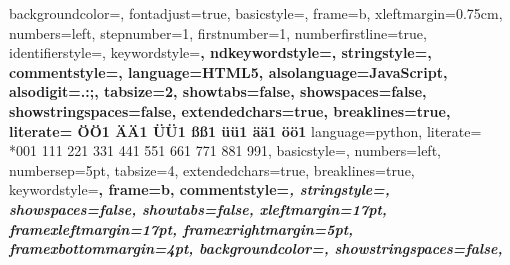  {%
	backgroundcolor=\color{editorGray},
		fontadjust=true,
	basicstyle=\small\ttfamily,   
	frame=b,
	xleftmargin={0.75cm},
	numbers=left,
	stepnumber=1,
	firstnumber=1,
	numberfirstline=true,	
	identifierstyle=\color{black},
	keywordstyle=\color{blue}\bfseries,
	ndkeywordstyle=\color{editorGreen}\bfseries,
	stringstyle=\color{editorOcher}\ttfamily,
	commentstyle=\color{brown}\ttfamily,
	language=HTML5,
	alsolanguage=JavaScript,
	alsodigit={.:;},	
	tabsize=2,
	showtabs=false,
	showspaces=false,
	showstringspaces=false,
	extendedchars=true,
	breaklines=true,
	literate=%
	{Ö}{{\"O}}1
	{Ä}{{\"A}}1
	{Ü}{{\"U}}1
	{ß}{{\ss}}1
	{ü}{{\"u}}1
	{ä}{{\"a}}1
	{ö}{{\"o}}1
}
 {%
	language=python,
	literate=%
	*{0}{{{\color{lightred}0}}}1
	{1}{{{\color{lightred}1}}}1
	{2}{{{\color{lightred}2}}}1
	{3}{{{\color{lightred}3}}}1
	{4}{{{\color{lightred}4}}}1
	{5}{{{\color{lightred}5}}}1
	{6}{{{\color{lightred}6}}}1
	{7}{{{\color{lightred}7}}}1
	{8}{{{\color{lightred}8}}}1
	{9}{{{\color{lightred}9}}}1,
	basicstyle=\small\ttfamily,
	numbers=left,
	numbersep=5pt,
	tabsize=4,
	extendedchars=true,
	breaklines=true,
	keywordstyle=\color{blue}\bfseries,
	frame=b,
	commentstyle=\color{brown}\itshape,
	stringstyle=\color{editorOcher}\ttfamily,
	showspaces=false,
	showtabs=false,
	xleftmargin=17pt,
	framexleftmargin=17pt,
	framexrightmargin=5pt,
	framexbottommargin=4pt,
	backgroundcolor=\color{lightgray},
	showstringspaces=false,
}
